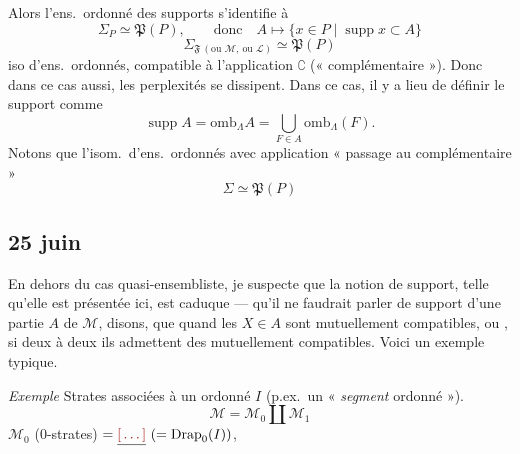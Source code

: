 \documentclass[11pt,a4paper]{article}
\begin{document}

Alors l'ens.\ ordonné des supports s'identifie à
\[
  \Sigma_{P} \simeq \mathfrak{P}(P) , \qquad \text{donc} \quad A \longmapsto \lbrace x \in P \mid \operatorname{supp} x \subset A \rbrace
\]
\[
  \Sigma_{\mathfrak{F}\ (\text{ou } \mathcal{M},\ \text{ou } \mathcal{L})} \simeq \mathfrak{P}(P)
\]
iso d'ens.\ ordonnés, compatible à l'application $\complement$ (« complémentaire »). Donc dans ce cas aussi, les perplexités se dissipent. Dans ce cas, il y a lieu de définir le support comme
\[
  \operatorname{supp} A = \mathrm{omb}_{\Lambda} A = \bigcup_{F \in A} \mathrm{omb}_{\Lambda}(F) .
\]
Notons que l'isom.\ d'ens.\ ordonnés avec application « passage au complémentaire »
\[
  \Sigma \simeq \mathfrak{P}(P)
\]

\subsection{25 juin}

En dehors du cas quasi-ensembliste, je suspecte que la notion de support, telle qu'elle est présentée ici, est caduque — qu'il ne faudrait parler de support d'une partie $A$ de $\mathcal{M}$, disons, que quand les $X \in A$  sont mutuellement compatibles, ou \ill{} , si deux à deux ils admettent des \ill{} mutuellement compatibles. Voici  \ill{} un exemple typique.

\emph{Exemple} \quad Strates associées à un   ordonné $I$ (p.ex.\ un « \emph{segment} ordonné »).
\[
  \mathcal{M} = \mathcal{M}_0 \amalg \mathcal{M}_1
\]
$\mathcal{M}_0$ (0-strates) $= \struck{\ill{}}\ (= \mathrm{Drap}_0(I))$,
\end{document}
